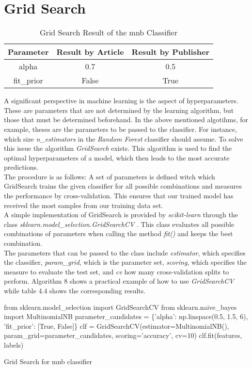 \documentclass[a4paper, 11pt,titlepage,oneside,openany]{book}
\begin{document}
\section{Grid Search}
\begin{table}[h]
	\centering
	\begin{tabular}{c|c|c}
		\toprule
		Parameter & Result by Article & Result by Publisher \\
		\midrule
		alpha & 0.7 & 0.5  \\
		fit\_prior & False & True \\
		\bottomrule
	\end{tabular}
	\caption{Grid Search Result of the \gls{mnb} Classifier}
\end{table}
\noindent A significant perspective in machine learning is the aspect of hyperparameters. These are parameters that are not determined by the learning algorithm, but those that must be determined beforehand. In the above mentioned algotihms, for example, theses are the parameters to be passed to the classifier. For instance, which size \textit{n\_estimators} in the \textit{Random Forest} classifier should assume. To solve this issue the algorithm \textit{GridSearch} exists. This algorithm is used to find the optimal hyperparameters of a model, which then leads to the most accurate predictions. \\
\noindent The procedure is as follows: A set of parameters is defined witch which GridSearch trains the given classifier for all possible combinations and measures the performance by cross-validation. This ensures that our trained model has received the most samples from our training data set. \\
\noindent A simple implementation of GridSearch is provided by \textit{scikit-learn} through the class \textit{sklearn.model\_selection.GridSearchCV} \cite{codegridsearch}. This class evaluates all possible combinations of parameters when calling the method \textit{fit()} and keeps the best combination. \\
\noindent The parameters that can be passed to the class include \textit{estimator}, which specifies the classifier, \textit{param\_grid}, which is the parameter set, \textit{scoring}, which specifies the measure to evaluate the test set, and \textit{cv} how many cross-validation splits to perform. Algorithm 8 shows a practical example of how to use \textit{GridSearchCV} while table 4.4 shows the corresponding results. \\
\begin{algorithm}[h]
	\DontPrintSemicolon
	from sklearn.model\_selection import GridSearchCV\;
	from sklearn.naive\_bayes import MultinomialNB\;
	\BlankLine
	parameter\_candidates = \{'alpha': np.linspace(0.5, 1.5, 6), 'fit\_prior': [True, False]\}\;
	clf = GridSearchCV(estimator=MultinomialNB(), param\_grid=parameter\_candidates, scoring='accuracy', cv=10)\;
	clf.fit(features, labels)\;
	\caption{Grid Search for \gls{mnb} classifier}
\end{algorithm}
\end{document}
